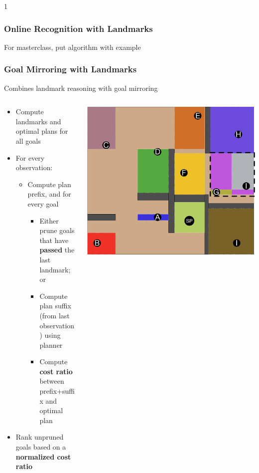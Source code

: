 \documentclass{beamer}
\newcommand{\todo}[1]{ {\color{red} #1} }
\def\masterclass{1}
\begin{document}
	\if\masterclass1
	\begin{frame}[c]\frametitle{Online Recognition with Landmarks}
		\todo{For masterclass, put algorithm with example}
	\end{frame}
	\fi
	
	\begin{frame}[c]\frametitle{Goal Mirroring with Landmarks}
		Combines landmark reasoning with goal mirroring
		\begin{columns}
			\begin{column}{0.7\textwidth}
			\begin{itemize}
				\item Compute landmarks and optimal plans for all goals
				\item For every observation:
				\begin{itemize}
					\item Compute plan prefix, and for every goal
					\begin{itemize}
						\item Either prune goals that have \textbf{passed} the last landmark; or
						\item Compute plan suffix (from last observation) using planner
						\item Compute \textbf{cost ratio} between prefix+suffix and optimal plan
					\end{itemize}
				\end{itemize}
				\item Rank unpruned goals based on a \textbf{normalized cost ratio}
			\end{itemize}
			\end{column}
			\begin{column}{0.3\textwidth}
				\includegraphics[width=\textwidth]{fig/continuous-landmark-example.pdf}

\end{column}
\end{columns}
\end{frame}
\end{document}
